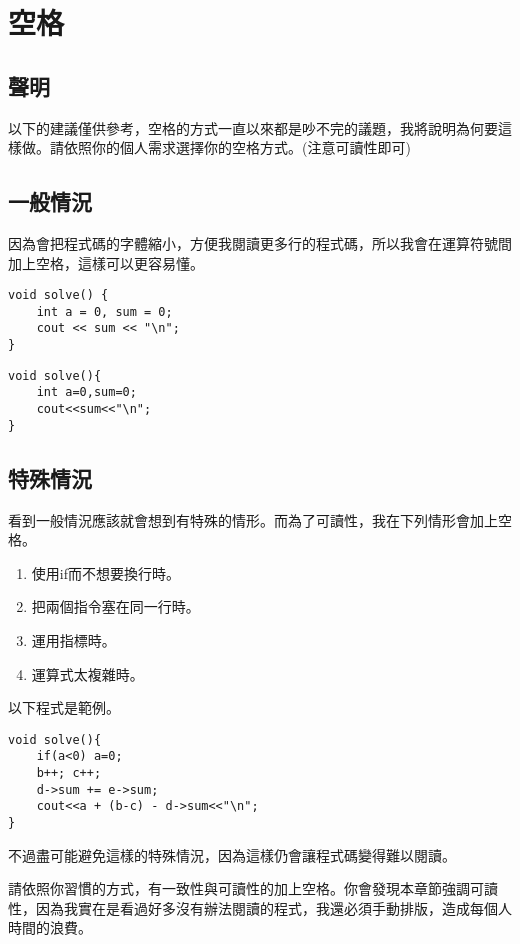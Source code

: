 \section{空格}
    \subsection{聲明}
    以下的建議僅供參考，空格的方式一直以來都是吵不完的議題，我將說明為何要這樣做。請依照你的個人需求選擇你的空格方式。(注意可讀性即可)

    \subsection{一般情況}
    因為會把程式碼的字體縮小，方便我閱讀更多行的程式碼，所以我會在運算符號間加上空格，這樣可以更容易懂。

    \begin{lstlisting}[caption=我的空格習慣(一般情況)]
void solve() {
    int a = 0, sum = 0;
    cout << sum << "\n";
}\end{lstlisting}

    \begin{lstlisting}[caption=不加上空格的版本]
void solve(){
    int a=0,sum=0;
    cout<<sum<<"\n";
}\end{lstlisting}


    \subsection{特殊情況}
    看到一般情況應該就會想到有特殊的情形。而為了可讀性，我在下列情形會加上空格。

    \begin{enumerate}
        \item 使用if而不想要換行時。
        \item 把兩個指令塞在同一行時。
        \item 運用指標時。
        \item 運算式太複雜時。
    \end{enumerate}
    
    以下程式是範例。
    
    \begin{lstlisting}[caption=特殊情況們]
void solve(){
    if(a<0) a=0;
    b++; c++;
    d->sum += e->sum;
    cout<<a + (b-c) - d->sum<<"\n";
}\end{lstlisting}

    不過盡可能避免這樣的特殊情況，因為這樣仍會讓程式碼變得難以閱讀。

    \begin{tip}
        請依照你習慣的方式，有一致性與可讀性的加上空格。你會發現本章節強調可讀性，因為我實在是看過好多沒有辦法閱讀的程式，我還必須手動排版，造成每個人時間的浪費。
    \end{tip}